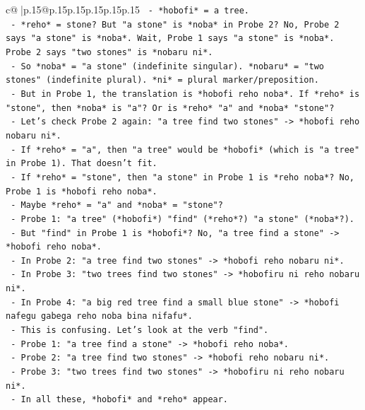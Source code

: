 \documentclass{article}
\begin{document}
{\begin{supertabular}{c@{$\;$}|p{.15\linewidth}@{}p{.15\linewidth}p{.15\linewidth}p{.15\linewidth}p{.15\linewidth}p{.15\linewidth}}
{{{\texttt{        {-} *hobofi* = a tree.} \\
\texttt{        {-} *reho* = stone? But "a stone" is *noba* in Probe 2? No, Probe 2 says "a stone" is *noba*. Wait, Probe 1 says "a stone" is *noba*. Probe 2 says "two stones" is *nobaru ni*.} \\
\texttt{        {-} So *noba* = "a stone" (indefinite singular). *nobaru* = "two stones" (indefinite plural). *ni* = plural marker/preposition.} \\
\texttt{        {-} But in Probe 1, the translation is *hobofi reho noba*. If *reho* is "stone", then *noba* is "a"? Or is *reho* "a" and *noba* "stone"?} \\
\texttt{        {-} Let's check Probe 2 again: "a tree find two stones" {-}> *hobofi reho nobaru ni*.} \\
\texttt{          {-} If *reho* = "a", then "a tree" would be *hobofi* (which is "a tree" in Probe 1). That doesn't fit.} \\
\texttt{          {-} If *reho* = "stone", then "a stone" in Probe 1 is *reho noba*? No, Probe 1 is *hobofi reho noba*.} \\
\texttt{          {-} Maybe *reho* = "a" and *noba* = "stone"?} \\
\texttt{            {-} Probe 1: "a tree" (*hobofi*) "find" (*reho*?) "a stone" (*noba*?).} \\
\texttt{            {-} But "find" in Probe 1 is *hobofi*? No, "a tree find a stone" {-}> *hobofi reho noba*.} \\
\texttt{            {-} In Probe 2: "a tree find two stones" {-}> *hobofi reho nobaru ni*.} \\
\texttt{            {-} In Probe 3: "two trees find two stones" {-}> *hobofiru ni reho nobaru ni*.} \\
\texttt{            {-} In Probe 4: "a big red tree find a small blue stone" {-}> *hobofi nafegu gabega reho noba bina nifafu*.} \\
\texttt{            {-} This is confusing. Let's look at the verb "find".} \\
\texttt{            {-} Probe 1: "a tree find a stone" {-}> *hobofi reho noba*.} \\
\texttt{            {-} Probe 2: "a tree find two stones" {-}> *hobofi reho nobaru ni*.} \\
\texttt{            {-} Probe 3: "two trees find two stones" {-}> *hobofiru ni reho nobaru ni*.} \\
\texttt{            {-} In all these, *hobofi* and *reho* appear.} \\
}}}
\end{supertabular}}
\end{document}
